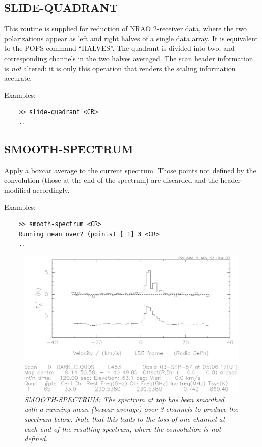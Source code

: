 \documentclass[11pt,twoside]{report}
\begin{document}
\subsection{SLIDE-QUADRANT} 

This routine is supplied for reduction of NRAO 2-receiver data, where
the two polarizations appear as left and right halves of a single data
array. It is equivalent to the POPS command ``HALVES''. The quadrant is
divided into two, and corresponding channels in the two halves averaged.
The scan header information is {\em not} altered: it is only this
operation that renders the scaling information accurate.

Examples:
\begin{verbatim}
    >> slide-quadrant <CR>
    ..
\end{verbatim}

\subsection{SMOOTH-SPECTRUM} 

Apply a boxcar average to the current spectrum. Those points not defined
by the convolution (\ie those at the end of the spectrum) are discarded and
the header modified accordingly.

Examples:
\begin{verbatim}
    >> smooth-spectrum <CR>
    Running mean over? (points) [ 1] 3 <CR>
    ..
\end{verbatim}

\begin{figure}[htbp]
\begin{center}
\includegraphics[scale=0.65]{smooth.ps}
\protect\parbox{5.5in}
{\caption[SMOOTH]
{\sl
SMOOTH-SPECTRUM: The spectrum at top has been smoothed with a running
mean (boxcar average) over 3 channels to produce the spectrum below.
Note that this leads to the loss of one channel at each end of the
resulting spectrum, where the convolution is not defined.
\label{SMOOTH}
}
}
\end{center}
\end{figure}
\end{document}
